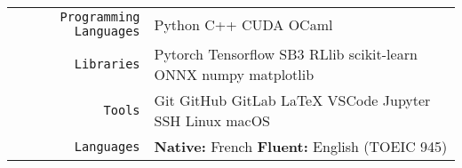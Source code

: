 \documentclass[
    10pt,
    A4,
    english,
    draft = false,
    twoside = false,
]{article}
\begin{document}
	\tab \begin{tabular}{r p{}}
		\texttt{\large Programming Languages} & Python \cvContactSep
		C++ \cvContactSep CUDA \cvContactSep OCaml\\
		\texttt{\large Libraries} & Pytorch \cvContactSep Tensorflow
		\cvContactSep SB3 \cvContactSep RLlib \cvContactSep
		scikit-learn \cvContactSep ONNX \cvContactSep numpy \cvContactSep
		matplotlib\\
		\texttt{\large Tools} & Git \cvContactSep GitHub \cvContactSep GitLab \cvContactSep \LaTeX \cvContactSep
		VSCode \cvContactSep Jupyter \cvContactSep SSH \cvContactSep Linux
		\cvContactSep macOS\\
		\texttt{\large Languages} & \textbf{Native:} French \cvContactSep \textbf{Fluent:} English (TOEIC 945)\\
	\end{tabular}\\~\\
	
	
	
	 
	
\end{document}
